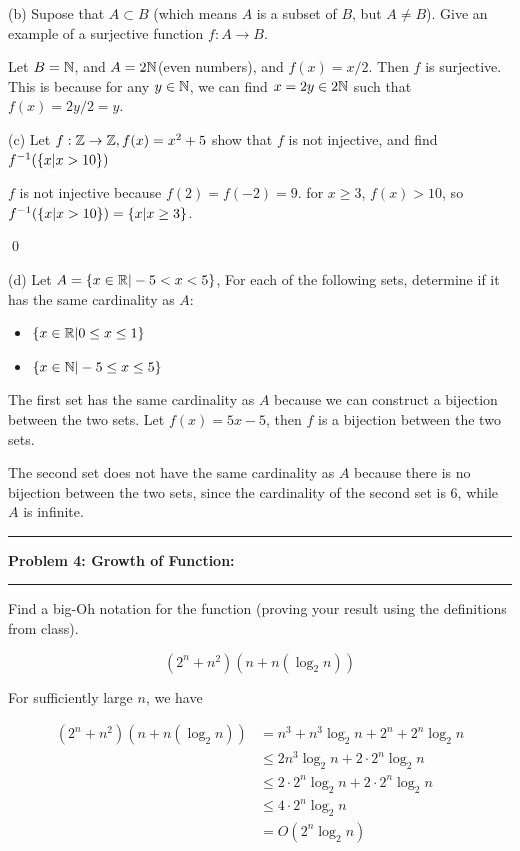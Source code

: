 \documentclass[11pt]{article}
\newcommand\question[2]{\vspace{.25in}\hrule\textbf{#1: #2}\vspace{.5em}\hrule\vspace{.10in}}
\begin{document}
(b) Supose that $A \subset B$ (which means $A$ is a subset of $B$, but $A \neq B$). Give an example of a surjective function $f : A \to B$.

\solution

Let $B = \mathbb{N}$, and $A = 2\mathbb{N}$(even numbers), and $f(x) = x/2$. Then $f$ is surjective.
This is because for any $y\in \mathbb{N}$, we can find $x = 2y\in 2\mathbb{N}$ such that $f(x) = 2y/2 = y$.

(c) Let $f:\mathbb{Z}\to \mathbb{Z}, f(x) = x^2 + 5$ show that $f$ is not injective, and find $f^{-1}(\{x|x>10\})$

\solution

$f$ is not injective because $f(2) = f(-2) = 9$. for $x \ge 3$, $f(x) > 10$, so $f^{-1}(\{x|x>10\}) = \{x|x\ge 3\}$.

\qed

(d) Let $A = \{x\in \mathbb{R}|-5 < x < 5\}$, For each of the following sets, determine if it has the same cardinality as $A$:
\begin{itemize}
    \item $\{x\in \mathbb{R}|0 \leq x \leq 1\}$
    \item $\{x\in \mathbb{N} | -5 \le x\le 5\}$
\end{itemize}

\solution

The first set has the same cardinality as $A$ because we can construct a bijection between the two sets. Let $f(x) = 5x-5$, then $f$ is a bijection between the two sets.

The second set does not have the same cardinality as $A$ because there is no bijection between the two sets, since the cardinality of the second set is $6$, while $A$ is infinite. 

\question{Problem 4: Growth of Function}{}

Find a big-Oh notation for the function (proving your result using the definitions from
class). 

\[(2^n + n ^2)(n+n(\log_2{n}))\]

\solution

For sufficiently large $n$, we have

\begin{align*}
    (2^n + n ^2)(n+n(\log_2{n})) &= n^3 + n^3\log_2{n} + 2^n + 2^n\log_2{n}\\
                                 &\le 2n^3\log_2{n} + 2\cdot2^n\log_2{n}\\
                                 &\le 2\cdot2^{n}\log_2{n} + 2\cdot2^n\log_2{n}\\
                                 &\le 4\cdot2^{n}\log_2{n}\\
                                 &= O(2^n\log_2{n})
\end{align*}
\end{document}

